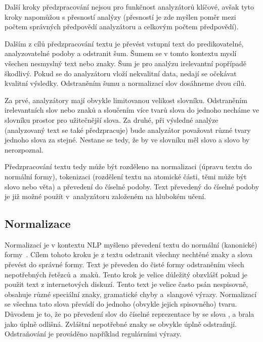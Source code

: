 Další kroky předzpracování nejsou pro funkčnost analyzátorů klíčové, avšak tyto kroky napomůžou s přesností analýzy (přesností je zde myšlen poměr mezi počtem správných předpovědí analyzátoru a celkovým počtem předpovědí). 

Dalším z cílů předzpracování textu je převést vstupní text do predikovatelné, analyzovatelné podoby a odstranit šum. Šumem se v tomto kontextu myslí všechen nesmyslný text nebo znaky. Šum je pro analýzu irelevantní popřípadě škodlivý. Pokud se do analyzátoru vloží nekvalitní data, nedají se očekávat kvalitní výsledky. 
Odstraněním šumu a normalizací slov dosáhneme dvou cílů. 

Za prvé, analyzátory mají obvykle limitovanou velikost slovníku. Odstraněním irelevantních slov nebo znaků a sloučením více tvarů slova do jednoho necháme ve slovníku prostor pro užitečnější slova.
Za druhé, při výsledné analýze (analyzovaný text se také předzpracuje) bude analyzátor považovat různé tvary jednoho slova za stejné. Nestane se tedy, že by ve slovníku měl slovo  a slovo  by nerozpoznal.

Předzpracování textu tedy může být rozděleno na normalizaci (úpravu textu do normální formy), tokenizaci (rozdělení textu na atomické části, těmi může být slovo nebo věta) a převedení do číselné podoby. Text převedený do číselné podoby je již možné použít v~analyzátoru založeném na hlubokém učení.

\subsection{Normalizace}
Normalizací je v kontextu NLP myšleno převedení textu do normální (kanonické) formy~\cite{mlexplained}. Cílem tohoto kroku je z textu odstranit všechny nechtěné znaky a slova převést do správné formy. Text je převeden do čisté formy odstraněním všech nepotřebných řetězců a~znaků. Tento krok je velice důležitý obzvlášť pokud je použit text z internetových diskuzí. Tento text je velice často psán nespisovně, obsahuje různé speciální znaky, gramatické chyby a~slangové výrazy. Normalizací se všechna tato slova převádí do jednoho (obvykle jejich spisovného) tvaru. Důvodem je to, že po převedení slov do číselné reprezentace by se slova , a  brala jako  úplně odlišná. Zvláštní nepotřebné znaky se obvykle úplně odstraňují. Odstraňování je prováděno například regulárními výrazy.

